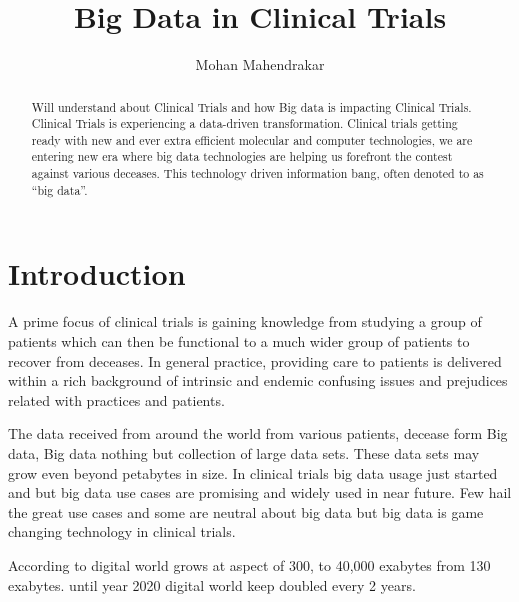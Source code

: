 \documentclass[sigconf]{acmart}
\begin{document}
\title{Big Data in Clinical Trials}
\author{Mohan Mahendrakar}

\renewcommand{\shortauthors}{B. Trovato et al.}


\begin{abstract}
Will understand about Clinical Trials and how Big
data is impacting Clinical Trials. Clinical Trials is experiencing a
data-driven transformation. Clinical trials getting ready with new and 
ever extra efficient molecular and computer technologies, we are entering
new era where big data technologies are helping us forefront the contest 
against various deceases. This technology driven information bang, often 
denoted to as ``big data''.

\end{abstract}


\maketitle

\section{Introduction}
A prime focus of clinical trials is gaining knowledge from studying
a group of patients which can then be functional to a much wider group of
patients to recover from deceases. In general practice, providing care 
to patients is delivered within a rich background of intrinsic and
endemic confusing issues and prejudices related with practices and 
patients\cite{TR02}.

The data received from around the world from various patients, 
decease form Big data, Big data nothing but collection of large 
data sets. These data sets may grow even beyond petabytes in size.  
In clinical trials big data usage just started and but big data use
cases are promising and widely used in near future. Few hail the great
use cases and some are neutral about big data but big data is game 
changing technology in clinical trials\cite{TR05}. 

According to \cite{TR07} digital world grows at aspect of 300, to 
40,000 exabytes from 130 exabytes. until year 2020  digital world 
keep doubled every 2 years. 
\end{document}

